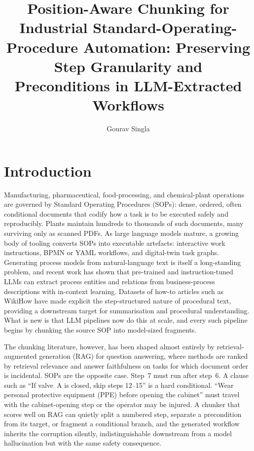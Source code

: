 \documentclass[fleqn,10pt]{wlscirep}
\title{Position-Aware Chunking for Industrial
Standard-Operating-Procedure Automation: Preserving Step Granularity
and Preconditions in LLM-Extracted Workflows}
\author[1,*]{Gourav Singla}
\affil[1]{Independent Researcher, Cumming, GA, USA}
\affil[*]{gouravsingla05@gmail.com}
\begin{document}
\flushbottom
\maketitle
\thispagestyle{empty}

\vskip12pt

\section*{Introduction}

Manufacturing, pharmaceutical, food-processing, and chemical-plant
operations are governed by Standard Operating Procedures (SOPs): dense,
ordered, often conditional documents that codify how a task is to be
executed safely and reproducibly. Plants maintain hundreds to thousands
of such documents, many surviving only as scanned PDFs. As large
language models mature\cite{brown2020gpt3}, a growing body of tooling
converts SOPs into executable artefacts: interactive work instructions,
BPMN or YAML workflows, and digital-twin task graphs. Generating
process models from natural-language text is itself a long-standing
problem\cite{friedrich2011process,vanderaa2018challenges}, and recent
work has shown that pre-trained and instruction-tuned LLMs can extract
process entities and relations from business-process descriptions with
in-context learning\cite{bellan2022extracting}. Datasets of how-to articles such as
WikiHow have made explicit the step-structured nature of procedural
text\cite{koupaee2018wikihow}, providing a downstream target for
summarisation and procedural understanding. What is new is that LLM pipelines now do
this at scale, and every such pipeline begins by chunking the source SOP
into model-sized fragments.

The chunking literature, however, has been shaped almost entirely by
retrieval-augmented generation
(RAG)\cite{lewis2020rag,karpukhin2020dpr} for question answering, where
methods are ranked by retrieval relevance and answer faithfulness on
tasks for which document order is incidental. SOPs are the opposite
case. Step~7 must run after step~6. A clause such as ``If valve~A is
closed, skip steps 12--15'' is a hard conditional. ``Wear personal
protective equipment (PPE) before opening the cabinet'' must travel with
the cabinet-opening step or the operator may be injured. A chunker that
scores well on RAG can quietly split a numbered step, separate a
precondition from its target, or fragment a conditional branch, and the
generated workflow inherits the corruption silently, indistinguishable
downstream from a model hallucination\cite{ji2023hallucination} but
with the same safety consequence.
\end{document}

